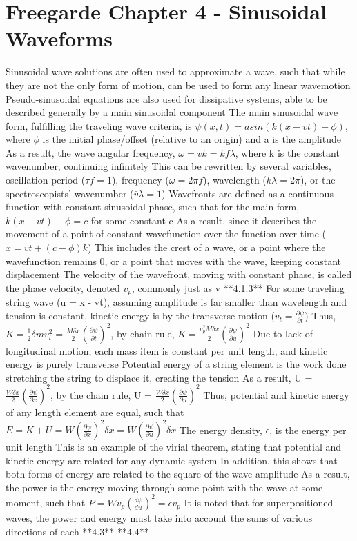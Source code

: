 \documentclass[11 pt, twoside]{article}
\newenvironment{outline*}
{
	\begin{outline}[enumerate]
	}
	{\end{outline}
}
\begin{document}
\section{Freegarde Chapter 4 - Sinusoidal Waveforms}
\begin{outline*}
\1 Sinusoidal wave solutions are often used to approximate a wave, such that while they are not the only form of motion, can be used to form any linear wavemotion
\2 Pseudo-sinusoidal equations are also used for dissipative systems, able to be described generally by a main sinusoidal component
\1 The main sinusoidal wave form, fulfilling the traveling wave criteria, is $\psi(x, t) = asin(k(x - vt) + \phi)$, where $\phi$ is the initial phase/offset (relative to an origin) and a is the amplitude
\2 As a result, the wave angular frequency, $\omega = vk = kf\lambda$, where k is the constant wavenumber, continuing infinitely
\2 This can be rewritten by several variables, oscillation period ($\tau f = 1$), frequency ($\omega = 2\pi f$), wavelength ($k\lambda = 2\pi$), or the spectroscopists' wavenumber ($\bar{v}\lambda = 1$)
\1 Wavefronts are defined as a continuous function with constant sinusoidal phase, such that for the main form, $k(x - vt) + \phi = c$ for some constant c
\2 As a result, since it describes the movement of a point of constant wavefunction over the function over time ($x = vt + (c - \phi)k$)
\2 This includes the crest of a wave, or a point where the wavefunction remains 0, or a point that moves with the wave, keeping constant displacement
\2 The velocity of the wavefront, moving with constant phase, is called the phase velocity, denoted $v_p$, commonly just as v
\2 **4.1.3**
\1 For some traveling string wave (u = x - vt), assuming amplitude is far smaller than wavelength and tension is constant, kinetic energy is by the transverse motion ($v_t = \frac{\partial \psi}{\partial t}$)
\2 Thus, $K = \frac{1}{2}\delta m v_t^2 = \frac{M \delta x}{2}(\frac{\partial \psi}{\partial t})^2$, by chain rule, $K = \frac{v_p^2M\delta x}{2}(\frac{\partial \psi}{\partial u})^2$
\3 Due to lack of longitudinal motion, each mass item is constant per unit length, and kinetic energy is purely transverse
\2 Potential energy of a string element is the work done stretching the string to displace it, creating the tension
\3 As a result, U = $\frac{W\delta x}{2}(\frac{\partial \psi}{\partial x})^2$, by the chain rule, U = $\frac{W\delta x}{2}(\frac{\partial \psi}{\partial u})^2$
\3 Thus, potential and kinetic energy of any length element are equal, such that $E = K + U = W(\frac{\partial \psi}{\partial x})^2\delta x = W(\frac{\partial \psi}{\partial u})^2\delta x$
\2 The energy density, $\epsilon$, is the energy per unit length
\2 This is an example of the virial theorem, stating that potential and kinetic energy are related for any dynamic system
\3 In addition, this shows that both forms of energy are related to the square of the wave amplitude
\2 As a result, the power is the energy moving through some point with the wave at some moment, such that $P = Wv_p(\frac{d\psi}{du})^2 = \epsilon v_p$
\2 It is noted that for superpositioned waves, the power and energy must take into account the sums of various directions of each
\1 **4.3**
\1 **4.4**
\end{outline*}
\end{document}
